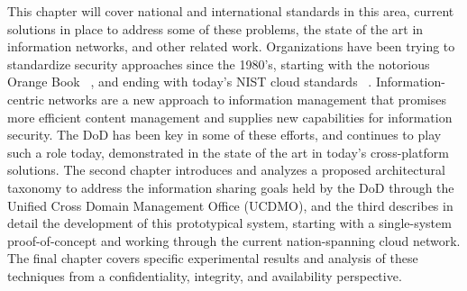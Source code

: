 This chapter will cover national and international standards in this area, current solutions in place to address some of these problems, the state of the art in information networks, and other related work.  Organizations have been trying to standardize security approaches since the 1980's, starting with the notorious Orange Book ~\cite{OrangeBook}, and ending with today's NIST cloud standards ~\cite{NIST800:144}.  Information-centric networks are a new approach to information management that promises more efficient content  management and supplies new capabilities for information security. The DoD has been key in some of these efforts, and continues to play such a role today, demonstrated in the state of the art in today's cross-platform solutions.  The second chapter introduces and analyzes a proposed architectural taxonomy to address the information sharing goals held by the DoD through the Unified Cross Domain Management Office (UCDMO), and the third describes in detail the development of this prototypical system, starting with a single-system proof-of-concept and working through the current nation-spanning cloud network.  The final chapter covers specific experimental results and analysis of these techniques from a confidentiality, integrity, and availability perspective.
